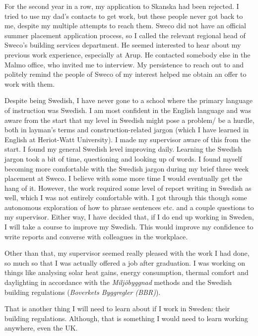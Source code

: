 For the second year in a row, my application to Skanska had been rejected.
I tried to use my dad's contacts to get work, but these people never got back to me, despite my multiple attempts to reach them.
Sweco did not have an official summer placement application process, so I called the relevant regional head of Sweco's building services department.
He seemed interested to hear about my previous work experience, especially at Arup.
He contacted somebody else in the Malmo office, who invited me to interview.
My persistence to reach out to and politely remind the people of Sweco of my interest helped me obtain an offer to work with them.

Despite being Swedish, I have never gone to a school where the primary language of instruction was Swedish.
I am most confident in the English language and was aware from the start that my level in Swedish might pose a problem/ be a hurdle, both in layman's terms and construction-related jargon (which I have learned in English at Heriot-Watt University).
I made my supervisor aware of this from the start.
I found my general Swedish level improving daily.
Learning the Swedish jargon took a bit of time, questioning and looking up of words.
I found myself becoming more comfortable with the Swedish jargon during my brief three week placement at Sweco.
I believe with some more time I would eventually get the hang of it.
However, the work required some level of report writing in Swedish as well, which I was not entirely comfortable with.
I got through this though some autonomous exploration of how to phrase sentences etc. and a couple questions to my supervisor.
Either way, I have decided that, if I do end up working in Sweden, I will take a course to improve my Swedish.
This would improve my confidence to write reports and converse with colleagues in the workplace.

Other than that, my supervisor seemed really pleased with the work I had done, so much so that I was actually offered a job after graduation.
I was working on things like analysing solar heat gains, energy consumption, thermal comfort and daylighting in accordance with the \textit{Miljöbyggnad} methods and the Swedish building regulations (\textit{Boverkets Byggregler (BBR)}).

That is another thing I will need to learn about if I work in Sweden: their building regulations.
Although, that is something I would need to learn working anywhere, even the UK.




